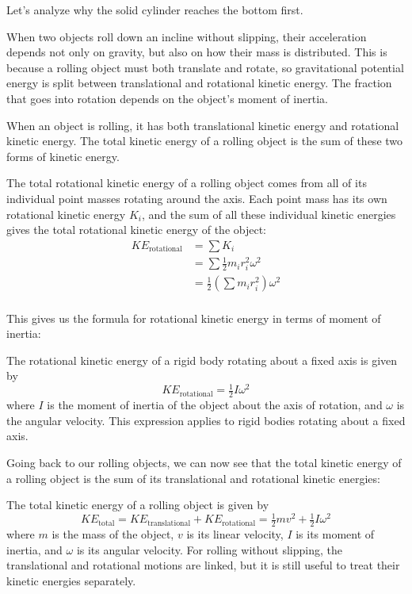 Let's analyze why the solid cylinder reaches the bottom first.

When two objects roll down an incline without slipping, their acceleration depends not only on gravity, but also on how their mass is distributed. This is because a rolling object must both translate and rotate, so gravitational potential energy is split between translational and rotational kinetic energy. The fraction that goes into rotation depends on the object's moment of inertia.

When an object is rolling, it has both translational kinetic energy and rotational kinetic energy. The total kinetic energy of a rolling object is the sum of these two forms of kinetic energy.

The total rotational kinetic energy of a rolling object comes from all of its individual point masses rotating around the axis. Each point mass has its own rotational kinetic energy $K_i$, and the sum of all these individual kinetic energies gives the total rotational kinetic energy of the object:
\begin{align*}
KE_{\text{rotational}}
&= \sum K_i \\
&= \sum \tfrac{1}{2} m_i r_i^2 \omega^2 \\
&= \tfrac{1}{2} \left( \sum m_i r_i^2 \right) \omega^2 \\
\end{align*}

This gives us the formula for rotational kinetic energy in terms of moment of inertia:
\begin{mdframed}[frametitle = {Rotational Kinetic Energy}, style = important]
The rotational kinetic energy of a rigid body rotating about a fixed axis is given by
\begin{equation}
  KE_{\text{rotational}} = \tfrac{1}{2} I \omega^2
\label{eq:rotKE}
\end{equation}
where $I$ is the moment of inertia of the object about the axis of rotation, and $\omega$ is the angular velocity. This expression applies to rigid bodies rotating about a fixed axis.
\end{mdframed}

Going back to our rolling objects, we can now see that the total kinetic energy of a rolling object is the sum of its translational and rotational kinetic energies:
\begin{mdframed}[frametitle = {Total Kinetic Energy of a Rolling Object}, style = important]
The total kinetic energy of a rolling object is given by
\begin{equation}
  KE_{\text{total}} = KE_{\text{translational}} + KE_{\text{rotational}} = \tfrac{1}{2} mv^2 + \tfrac{1}{2} I \omega^2
\label{eq:totalKErolling}
\end{equation}
where $m$ is the mass of the object, $v$ is its linear velocity, $I$ is its moment of inertia, and $\omega$ is its angular velocity. For rolling without slipping, the translational and rotational motions are linked, but it is still useful to treat their kinetic energies separately.
\end{mdframed}

